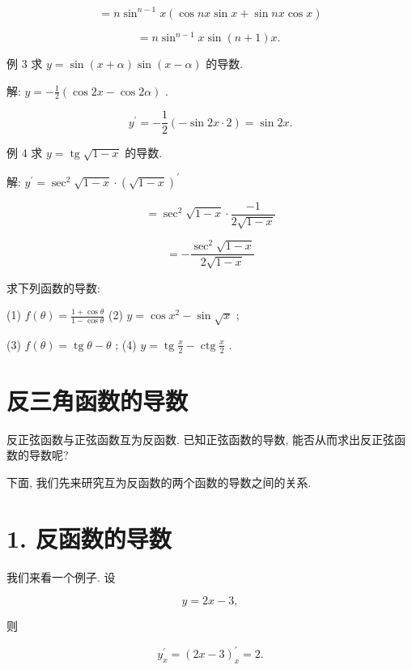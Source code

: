 \documentclass[lang=cn,newtx,10pt,scheme=chinese]{elegantbook}
\begin{document}
\[
= n{\sin }^{n - 1}x\left( {\cos {nx}\sin x + \sin {nx}\cos x}\right)
\]

\[
= n{\sin }^{n - 1}x\sin \left( {n + 1}\right) x\text{. }
\]

例 3 求 \(y = \sin \left( {x + \alpha }\right) \sin \left( {x - \alpha }\right)\) 的导数.

解: \(y = - \frac{1}{2}\left( {\cos {2x} - \cos {2\alpha }}\right)\) .

\[
{y}^{\prime } = - \frac{1}{2}\left( {-\sin {2x} \cdot 2}\right) = \sin {2x}.
\]

例 4 求 \(y = \operatorname{tg}\sqrt{1 - x}\) 的导数.

解: \({y}^{\prime } = {\sec }^{2}\sqrt{1 - x} \cdot {\left( \sqrt{1 - x}\right) }^{\prime }\)

\[
= {\sec }^{2}\sqrt{1 - x} \cdot \frac{-1}{2\sqrt{1 - x}}
\]

\[
= - \frac{{\sec }^{2}\sqrt{1 - x}}{2\sqrt{1 - x}}
\]

\begin{problemset}[练习]

\item 求下列函数的导数:

(1) \(f\left( \theta \right) = \frac{1 + \cos \theta }{1 - \cos \theta }\) (2) \(y = \cos {x}^{2} - \sin \sqrt{x}\) ;

(3) \(f\left( \theta \right) = \operatorname{tg}\theta - \theta\) ; (4) \(y = \operatorname{tg}\frac{x}{2} - \operatorname{ctg}\frac{x}{2}\) .

\end{problemset}

\section{反三角函数的导数}

反正弦函数与正弦函数互为反函数. 已知正弦函数的导数, 能否从而求出反正弦函数的导数呢?

下面, 我们先来研究互为反函数的两个函数的导数之间的关系.

\section*{1. 反函数的导数}

我们来看一个例子. 设

\[
y = {2x} - 3,
\]

则

\[
{y}_{x}^{\prime } = {\left( 2x - 3\right) }_{x}^{\prime } = 2.
\]
\end{document}
